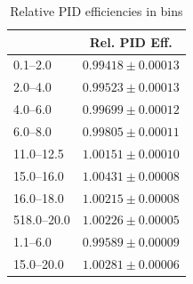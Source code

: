 \begin{table}
\centering
\caption{Relative PID efficiencies in \qsq bins}
\begin{tabular}{lc} \hline
\qsq [\gevgevcccc]	&     Rel.  PID Eff.            \\  \hline
0.1--2.0    & $0.99418 \pm 0.00013$  \\
2.0--4.0    & $0.99523 \pm 0.00013$   \\
4.0--6.0    & $0.99699 \pm 0.00012$   \\
6.0--8.0    & $0.99805 \pm 0.00011$   \\
11.0--12.5  & $1.00151 \pm 0.00010$   \\
15.0--16.0  & $1.00431 \pm 0.00008$   \\
16.0--18.0  & $1.00215 \pm 0.00008$   \\
518.0--20.0  & $1.00226 \pm 0.00005$   \\
\hline
1.1--6.0    & $0.99589 \pm 0.00009$   \\
15.0--20.0  & $1.00281 \pm 0.00006$  \\
\hline
\end{tabular}
\label{tab:Lb_PIDrel}
\end{table}





